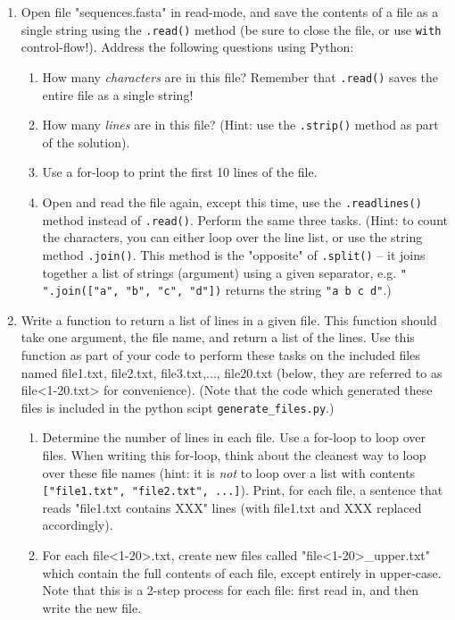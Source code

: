 \documentclass{article}[12pt]
\newcommand{\code}[1]{\texttt{#1}}  %
\begin{document}
\begin{enumerate}[itemsep=5ex]

	\item Open file "sequences.fasta" in read-mode, and save the contents of a file as a single string using the \code{.read()} method (be sure to close the file, or use \code{with} control-flow!). Address the following questions using Python:
	
	\begin{enumerate}[itemsep=2ex]
		\item How many \emph{characters} are in this file? Remember that \code{.read()} saves the entire file as a single string!
		\item How many \emph{lines} are in this file? (Hint: use the \code{.strip()} method as part of the solution).
		\item Use a for-loop to print the first 10 lines of the file.
		\item Open and read the file again, except this time, use the \code{.readlines()} method instead of \code{.read()}. Perform the same three tasks. (Hint: to count the characters, you can either loop over the line list, or use the string method \code{.join()}. This method is the "opposite" of \code{.split()} -- it joins together a list of strings (argument) using a given separator, e.g. \code{" ".join(["a", "b", "c", "d"])} returns the string \code{"a b c d"}.)
	\end{enumerate}
	
	\item Write a function to return a list of lines in a given file. This function should take one argument, the file name, and return a list of the lines. Use this function as part of your code to perform these tasks on the included files named file1.txt, file2.txt, file3.txt,..., file20.txt (below, they are referred to as file<1-20.txt> for convenience). (Note that the code which generated these files is included in the python scipt \code{generate\_files.py}.)
		\begin{enumerate}[itemsep=2ex]
			\item Determine the number of lines in each file. Use a for-loop to loop over files. When writing this for-loop, think about the cleanest way to loop over these file names (hint: it is \emph{not} to loop over a list with contents \code{["file1.txt", "file2.txt", ...]}). Print, for each file, a sentence that reads "file1.txt contains XXX" lines (with file1.txt and XXX replaced accordingly).
			\item For each file<1-20>.txt, create new files called "file<1-20>\_upper.txt" which contain the full contents of each file, except entirely in upper-case. Note that this is a 2-step process for each file: first read in, and then write the new file. 
		\end{enumerate}
	

\end{enumerate}
\end{document}
